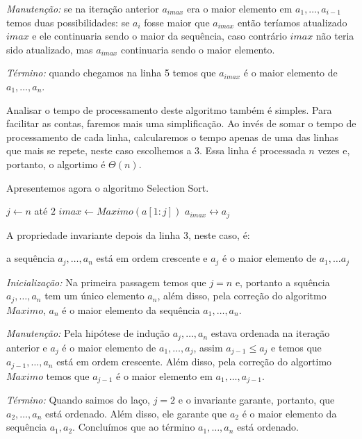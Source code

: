   {\em Manutenção:} se na iteração anterior $a_{imax}$ era o maior elemento em $a_1, \dots, a_{i-1}$ temos duas possibilidades: se $a_i$ fosse maior que $a_{imax}$ então teríamos atualizado $imax$ e ele continuaria sendo o maior da sequência, caso contrário $imax$ não teria sido atualizado, mas $a_{imax}$ continuaria sendo o maior elemento.

  {\em Término:} quando chegamos na linha 5 temos que $a_{imax}$ é o maior elemento de $a_1, \dots, a_n$.

  Analisar o tempo de processamento deste algoritmo também é simples.
  Para facilitar as contas, faremos mais uma simplificação.
  Ao invés de somar o tempo de processamento de cada linha, calcularemos o tempo apenas de uma das linhas que mais se repete, neste caso escolhemos a 3.
  Essa linha é processada $n$ vezes e, portanto, o algortimo é $\Theta(n)$.

  Apresentemos agora o algoritmo Selection Sort.

  
  \begin{codebox}
\li \For $j \gets n$ até $2$
\li \Do $imax \gets Maximo(a[1:j])$
\li     \Then $a_{imax} \leftrightarrow a_j$
        \End
    \End
\End
  \end{codebox}

  A propriedade invariante depois da linha 3, neste caso, é:
  \begin{center}
    a sequência $a_j, \dots, a_n$ está em ordem crescente e $a_j$ é o maior elemento de $a_1, \dots a_j$
  \end{center}

  {\em Inicialização:} Na primeira passagem temos que $j=n$ e, portanto a squência $a_j, \dots, a_n$ tem um único elemento $a_n$, além disso, pela correção do algoritmo $Maximo$, $a_n$ é o maior elemento da sequência $a_1, \dots, a_n$.

  {\em Manutenção:} Pela hipótese de indução $a_j, \dots, a_n$ estava ordenada na iteração anterior e $a_j$ é o maior elemento de $a_1, \dots, a_j$, assim $a_{j-1} \leq a_j$ e temos que $a_{j-1}, \dots, a_n$ está em ordem crescente.
  Além disso, pela correção do algortimo $Maximo$ temos que $a_{j-1}$ é o maior elemento em $a_1, \dots, a_{j-1}$.

  {\em Término:} Quando saimos do laço, $j=2$ e o invariante garante, portanto, que $a_2, \dots, a_n$ está ordenado.
  Além disso, ele garante que $a_2$ é o maior elemento da sequência $a_1, a_2$.
  Concluímos que ao término $a_1, \dots, a_n$ está ordenado.
  


